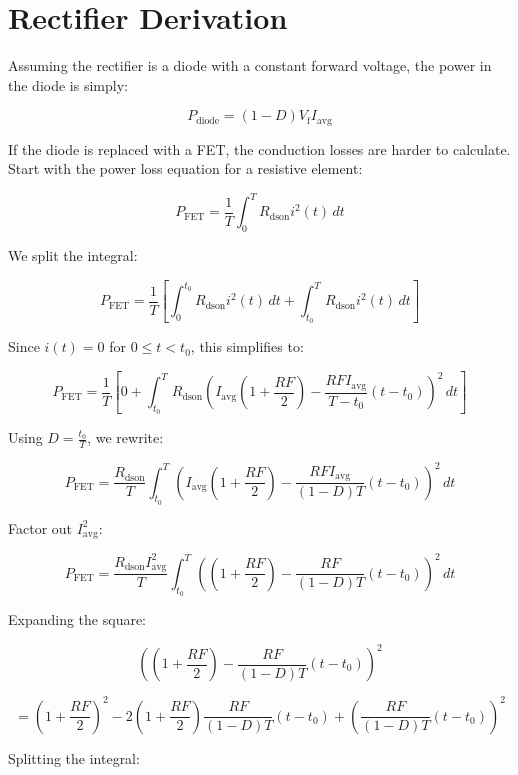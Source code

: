\documentclass{article}
\begin{document}
\section{Rectifier Derivation}

Assuming the rectifier is a diode with a constant forward voltage, the power in the diode is simply:

\begin{equation}
P_\text{diode} = (1-D) V_\text{f} I_\text{avg}
\end{equation}

If the diode is replaced with a FET, the conduction losses are harder to calculate.  Start with the power loss equation for a resistive element:

\[
P_\text{FET} = \frac{1}{T} \int_{0}^{T} R_\text{dson} i^2(t) \, dt
\]

We split the integral:

\[
P_\text{FET} = \frac{1}{T} \left[\int_{0}^{t_0} R_\text{dson} i^2(t) \, dt + \int_{t_0}^{T} R_\text{dson} i^2(t) \, dt \right]
\]

Since \( i(t) = 0 \) for \( 0 \leq t < t_0 \), this simplifies to:

\[
P_\text{FET} = \frac{1}{T} \left[ 0 + \int_{t_0}^{T} R_\text{dson} \left( I_\text{avg} \left( 1+\frac{RF}{2} \right) - \frac{RF I_\text{avg}}{T-t_0}(t-t_0) \right)^2 \, dt \right]
\]

Using \( D = \frac{t_0}{T} \), we rewrite:

\[
P_\text{FET} = \frac{R_\text{dson}}{T} \int_{t_0}^{T} \left( I_\text{avg} \left(1+\frac{RF}{2} \right) - \frac{RF I_\text{avg}}{(1-D)T}(t-t_0) \right)^2 \, dt
\]

Factor out \( I_\text{avg}^2 \):

\[
P_\text{FET} = \frac{R_\text{dson} I_\text{avg}^2}{T} \int_{t_0}^{T} \left( \left(1+\frac{RF}{2} \right) - \frac{RF}{(1-D)T}(t-t_0) \right)^2 \, dt
\]

Expanding the square:

\[
\left( (1+\frac{RF}{2})-\frac{RF}{(1-D)T}(t-t_0) \right)^2
\]

\[
= \left(1 + \frac{RF}{2} \right)^2 - 2 \left(1 + \frac{RF}{2} \right) \frac{RF}{(1-D)T} (t-t_0) + \left( \frac{RF}{(1-D)T} (t-t_0) \right)^2
\]

Splitting the integral:

\end{document}

